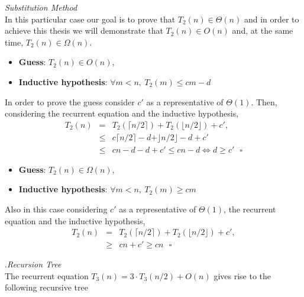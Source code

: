 \documentclass{article}
\begin{document}
	
	\noindent \textit{Substitution Method} \\
	In this particular case our goal is to prove that $T_2(n) \in \Theta(n)$ and in order to achieve this thesis we will demonstrate that $T_2(n) \in O(n)$ and, at the same time, $T_2(n) \in \Omega (n) $. \\	
	\begin{itemize}
		\item \textbf{Guess}: $T_2(n) \in O(n)$,
		\item \textbf{Inductive hypothesis}: $\forall m < n, ~  T_2(m) \leq cm - d$
	\end{itemize}
	In order to prove the guess consider $c'$ as a representative of $\Theta(1)$. Then, considering the recurrent equation and the inductive hypothesis,
	\begin{eqnarray}
	\nonumber
	T_2(n) &=&  T_2 \left(  \lceil n/2 \rceil \right)  + T_2 \left( \lfloor n/2 \rfloor \right) + c',\\
	\nonumber
	&\leq&  c \lceil n/2 \rceil -d + \rfloor n/2 \rfloor - d + c' \\
	\nonumber
	&\leq& cn - d - d + c' \leq cn - d \Leftrightarrow d \geq c' ~~~ \square
	\nonumber 
	\end{eqnarray} 
	
	\begin{itemize}
		\item \textbf{Guess}: $T_2(n) \in \Omega(n)$,
		\item \textbf{Inductive hypothesis}: $\forall m < n, ~  T_2(m) \geq cm$
	\end{itemize}
	Also in this case considering $c'$ as a representative of $\Theta(1)$, the recurrent equation and the inductive hypothesis,
	\begin{eqnarray}
	\nonumber
	T_2(n) &=&  T_2 \left(  \lceil n/2 \rceil \right)  + T_2 \left( \lfloor n/2 \rfloor \right) + c',\\
	\nonumber
	&\geq&  cn + c' \geq cn ~~~ \square
	\nonumber  
	\end{eqnarray} 
	
	.\textit{Recursion Tree} \\ The recurrent equation $T_3(n) = 3 \cdot T_3(n/2) + O(n)$  gives rise to the following recursive tree \\
\end{document}
